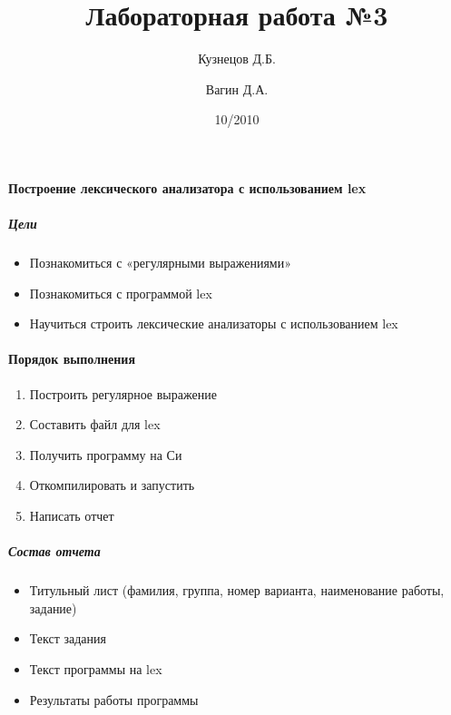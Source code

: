\documentclass[a4paper,12pt]{article}
\title{Лабораторная работа №3}
\author{Кузнецов Д.Б.\and Вагин Д.А.}
\date{10/2010}
\begin{document}
\paragraph{Построение лексического анализатора с использованием lex}
\subparagraph{Цели}
\begin{itemize}
	\item Познакомиться с «регулярными выражениями»
	\item Познакомиться с программой lex
	\item Научиться строить лексические анализаторы с использованием lex
\end{itemize}

\paragraph{Порядок выполнения}
\begin{enumerate}
	\item Построить регулярное выражение
	\item Составить файл для lex
	\item Получить программу на Си
	\item Откомпилировать и запустить
	\item Написать отчет
\end{enumerate}

\subparagraph{Состав отчета}
\begin{itemize}
	\item Титульный лист (фамилия, группа, номер варианта, наименование работы, задание)
	\item Текст задания
	\item Текст программы на lex
	\item Результаты работы программы
\end{itemize}
\end{document}
